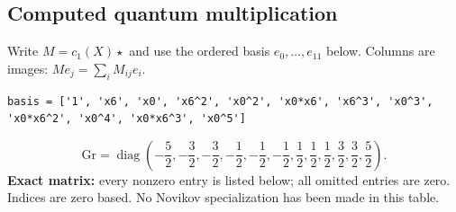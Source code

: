 \documentclass[10pt,a4paper]{article}
\begin{document}
\subsection*{Computed quantum multiplication}
Write $M=c_1(X)\star$ and use the ordered basis $e_0,\ldots,e_{11}$ below. Columns are images: $M e_j=\sum_i M_{ij}e_i$.
\begin{lstlisting}
basis = ['1', 'x6', 'x0', 'x6^2', 'x0^2', 'x0*x6', 'x6^3', 'x0^3', 'x0*x6^2', 'x0^4', 'x0*x6^3', 'x0^5']
\end{lstlisting}
\[\mathrm{Gr}=\operatorname{diag}\!\left(- \frac{5}{2},- \frac{3}{2},- \frac{3}{2},- \frac{1}{2},- \frac{1}{2},- \frac{1}{2},\frac{1}{2},\frac{1}{2},\frac{1}{2},\frac{3}{2},\frac{3}{2},\frac{5}{2}\right).\]
\textbf{Exact matrix:} every nonzero entry is listed below; all omitted entries are zero. Indices are zero based. No Novikov specialization has been made in this table.
\end{document}
